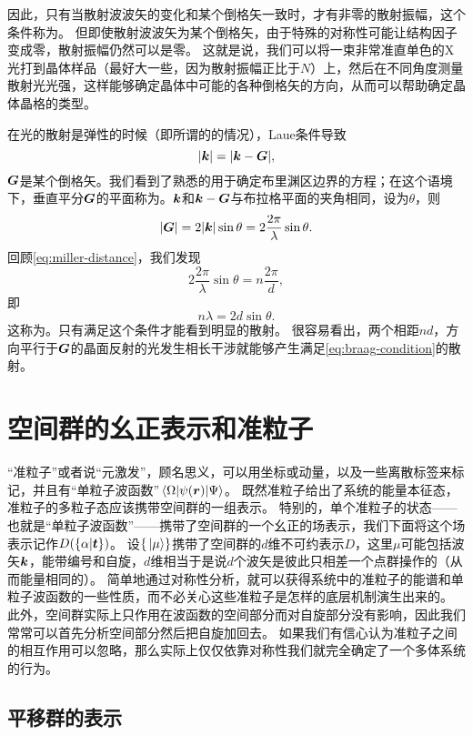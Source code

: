 因此，只有当散射波波矢的变化和某个倒格矢一致时，才有非零的散射振幅，这个条件称为。
但即使散射波波矢为某个倒格矢，由于特殊的对称性可能让结构因子变成零，散射振幅仍然可以是零。
这就是说，我们可以将一束非常准直单色的X光打到晶体样品（最好大一些，因为散射振幅正比于$N$）上，然后在不同角度测量散射光光强，这样能够确定晶体中可能的各种倒格矢的方向，从而可以帮助确定晶体晶格的类型。

在光的散射是弹性的时候（即所谓的的情况），Laue条件导致
\[
    \abs{\vb*{k}} = \abs{\vb*{k} - \vb*{G}},
\]
$\vb*{G}$是某个倒格矢。我们看到了熟悉的用于确定布里渊区边界的方程；在这个语境下，垂直平分$\vb*{G}$的平面称为。$\vb*{k}$和$\vb*{k} - \vb*{G}$与布拉格平面的夹角相同，设为$\theta$，则
\[
    \abs{\vb*{G}} = 2 \abs{\vb*{k}} \sin \theta = 2 \frac{2\pi}{\lambda} \sin \theta.
\]
回顾\eqref{eq:miller-distance}，我们发现
\[
    2 \frac{2\pi}{\lambda} \sin \theta = n \frac{2\pi}{d}, 
\]
即
\begin{equation}
    n \lambda = 2 d \sin \theta.
    \label{eq:braag-condition}
\end{equation}
这称为。只有满足这个条件才能看到明显的散射。
很容易看出，两个相距$nd$，方向平行于$\vb*{G}$的晶面反射的光发生相长干涉就能够产生满足\eqref{eq:braag-condition}的散射。

\section{空间群的幺正表示和准粒子}

“准粒子”或者说“元激发”，顾名思义，可以用坐标或动量，以及一些离散标签来标记，并且有“单粒子波函数”$\mel{\Omega}{\psi(\vb*{r})}{\Psi}$。
既然准粒子给出了系统的能量本征态，准粒子的多粒子态应该携带空间群的一组表示。
特别的，单个准粒子的状态——也就是“单粒子波函数”——携带了空间群的一个幺正的场表示，我们下面将这个场表示记作$D(\{\alpha | \vb*{t}\})$。
设$\{\ket*{\mu}\}$携带了空间群的$d$维不可约表示$D$，这里$\mu$可能包括波矢$\vb*{k}$，能带编号和自旋，$d$维相当于是说$d$个波矢是彼此只相差一个点群操作的（从而能量相同的）。
简单地通过对称性分析，就可以获得系统中的准粒子的能谱和单粒子波函数的一些性质，而不必关心这些准粒子是怎样的底层机制演生出来的。
此外，空间群实际上只作用在波函数的空间部分而对自旋部分没有影响，因此我们常常可以首先分析空间部分然后把自旋加回去。
如果我们有信心认为准粒子之间的相互作用可以忽略，那么实际上仅仅依靠对称性我们就完全确定了一个多体系统的行为。

\subsection{平移群的表示}\label{sec:transition-group-rep}

